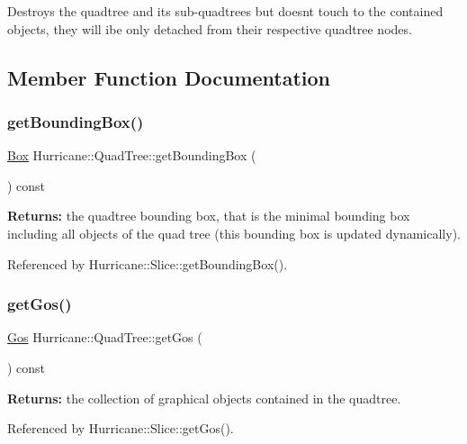 Destroys the quadtree and its sub-\/quadtrees but doesn\textquotesingle{}t touch to the contained objects, they will ibe only detached from their respective quadtree nodes. 

\subsection{Member Function Documentation}
\mbox{\label{classHurricane_1_1QuadTree_a80806e2d7e99fee07d0335697ed9b82b}} 
\subsubsection{\texorpdfstring{get\+Bounding\+Box()}{getBoundingBox()}}
{\footnotesize\ttfamily \hyperlink{classHurricane_1_1Box}{Box} Hurricane\+::\+Quad\+Tree\+::get\+Bounding\+Box (\begin{DoxyParamCaption}{ }\end{DoxyParamCaption}) const}

{\bfseries Returns\+:} the quadtree bounding box, that is the minimal bounding box including all objects of the quad tree (this bounding box is updated dynamically). 

Referenced by Hurricane\+::\+Slice\+::get\+Bounding\+Box().

\mbox{\label{classHurricane_1_1QuadTree_a571dd774ee953dfebb3d4162f98c679c}} 
\subsubsection{\texorpdfstring{get\+Gos()}{getGos()}}
{\footnotesize\ttfamily \hyperlink{namespaceHurricane_a4456a34f3bc6766d471c3064ace19759}{Gos} Hurricane\+::\+Quad\+Tree\+::get\+Gos (\begin{DoxyParamCaption}{ }\end{DoxyParamCaption}) const}

{\bfseries Returns\+:} the collection of graphical objects contained in the quadtree. 

Referenced by Hurricane\+::\+Slice\+::get\+Gos().

